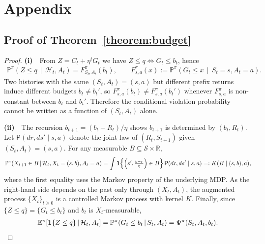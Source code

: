 \newpage
\section{Appendix}
\subsection{Proof of Theorem~\ref{theorem:budget}}
\begin{proof}
\textbf{(i)}\ \ From $Z=C_t+\eta^t G_t$ we have $Z\le q\Leftrightarrow G_t\le b_t$, hence
\begin{align}
    \mathbb{P}^{\pi}\!\left(Z\le q\,\middle|\,\mathcal{H}_t,A_t\right)
    =
    F^{\pi}_{S_t,A_t}(b_t),
    \qquad
    F^{\pi}_{s,a}(x):=\mathbb{P}^{\pi}\!\left(G_t\le x\,\middle|\,S_t=s,A_t=a\right).
\end{align}
Two histories with the same $(S_t,A_t)=(s,a)$ but different prefix returns induce different budgets $b_t\neq b_t'$, so $F^{\pi}_{s,a}(b_t)\neq F^{\pi}_{s,a}(b_t')$ whenever $F^{\pi}_{s,a}$ is non-constant between $b_t$ and $b_t'$. Therefore the conditional violation probability cannot be written as a function of $(S_t,A_t)$ alone.

\textbf{(ii)}\ \ The recursion $b_{t+1}=(b_t-R_t)/\eta$ shows $b_{t+1}$ is determined by $(b_t,R_t)$. Let $\mathsf{P}(dr,ds'\mid s,a)$ denote the joint law of $(R_t,S_{t+1})$ given $(S_t,A_t)=(s,a)$. For any measurable $B\subseteq\mathcal{S}\times\mathbb{R}$,
\begin{align}
    \mathbb{P}^{\pi}\!\left(X_{t+1}\in B\,\middle|\,\mathcal{H}_t,X_t=(s,b),A_t=a\right)
    =
    \int\mathbf{1}\!\left\{\Bigl(s',\tfrac{b-r}{\eta}\Bigr)\in B\right\}\mathsf{P}(dr,ds'\mid s,a)
    =:K(B\mid(s,b),a),
\end{align}
where the first equality uses the Markov property of the underlying MDP. As the right-hand side depends on the past only through $(X_t,A_t)$, the augmented process $\{X_t\}_{t\ge0}$ is a controlled Markov process with kernel $K$. Finally, since $\{Z\le q\}=\{G_t\le b_t\}$ and $b_t$ is $X_t$-measurable,
\begin{align}
    \mathbb{E}^{\pi}\!\left[\mathbf{1}\{Z\le q\}\,\middle|\,\mathcal{H}_t,A_t\right]
    =
    \mathbb{P}^{\pi}\!\left(G_t\le b_t\,\middle|\,S_t,A_t\right)
    =
    \Psi^{\pi}(S_t,A_t,b_t). \qedhere
\end{align}
\end{proof}



